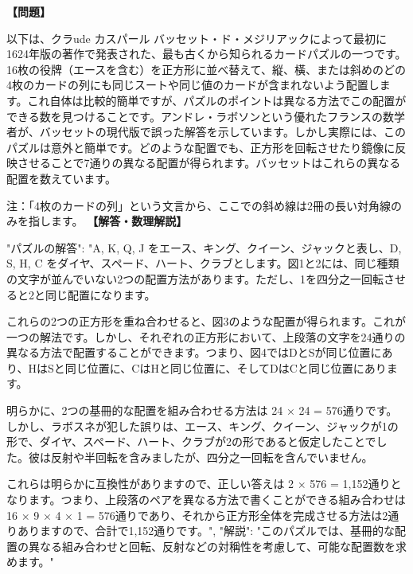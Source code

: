 \documentclass[10pt,a4paper,oneside,openany]{ltjsbook}
\begin{document}
\begin{tcolorbox}[colback=softblue,colframe=primaryblue,title=\textbf{第 304 問：BACHET'S SQUARE.},arc=2mm,boxrule=1pt,breakable]
\textbf{【問題】}\par\vspace{0.3em}
以下は、クラude カスパール バッセット・ド・メジリアックによって最初に1624年版の著作で発表された、最も古くから知られるカードパズルの一つです。16枚の役牌（エースを含む）を正方形に並べ替えて、縦、橫、または斜めのどの4枚のカードの列にも同じスートや同じ値のカードが含まれないよう配置します。これ自体は比較的簡単ですが、パズルのポイントは異なる方法でこの配置ができる数を見つけることです。アンドレ・ラボソンという優れたフランスの数学者が、バッセットの現代版で誤った解答を示しています。しかし実際には、このパズルは意外と簡単です。どのような配置でも、正方形を回転させたり鏡像に反映させることで7通りの異なる配置が得られます。バッセットはこれらの異なる配置を数えています。

注：「4枚のカードの列」という文言から、ここでの斜め線は2冊の長い対角線のみを指します。
\tcblower
\textbf{【解答・数理解説】}\par\vspace{0.3em}
{
"パズルの解答": "A, K, Q, J をエース、キング、クイーン、ジャックと表し、D, S, H, C をダイヤ、スペード、ハート、クラブとします。図1と2には、同じ種類の文字が並んでいない2つの配置方法があります。ただし、1を四分之一回転させると2と同じ配置になります。

これらの2つの正方形を重ね合わせると、図3のような配置が得られます。これが一つの解法です。しかし、それぞれの正方形において、上段落の文字を24通りの異なる方法で配置することができます。つまり、図4ではDとSが同じ位置にあり、HはSと同じ位置に、CはHと同じ位置に、そしてDはCと同じ位置にあります。

明らかに、2つの基冊的な配置を組み合わせる方法は 24 × 24 = 576通りです。しかし、ラボスネが犯した誤りは、エース、キング、クイーン、ジャックが1の形で、ダイヤ、スペード、ハート、クラブが2の形であると仮定したことでした。彼は反射や半回転を含みましたが、四分之一回転を含んでいません。

これらは明らかに互換性がありますので、正しい答えは 2 × 576 = 1,152通りとなります。つまり、上段落のペアを異なる方法で書くことができる組み合わせは 16 × 9 × 4 × 1 = 576通りであり、それから正方形全体を完成させる方法は2通りありますので、合計で1,152通りです。",
"解説": "このパズルでは、基冊的な配置の異なる組み合わせと回転、反射などの対稱性を考慮して、可能な配置数を求めます。"
}
\end{tcolorbox}
\end{document}

